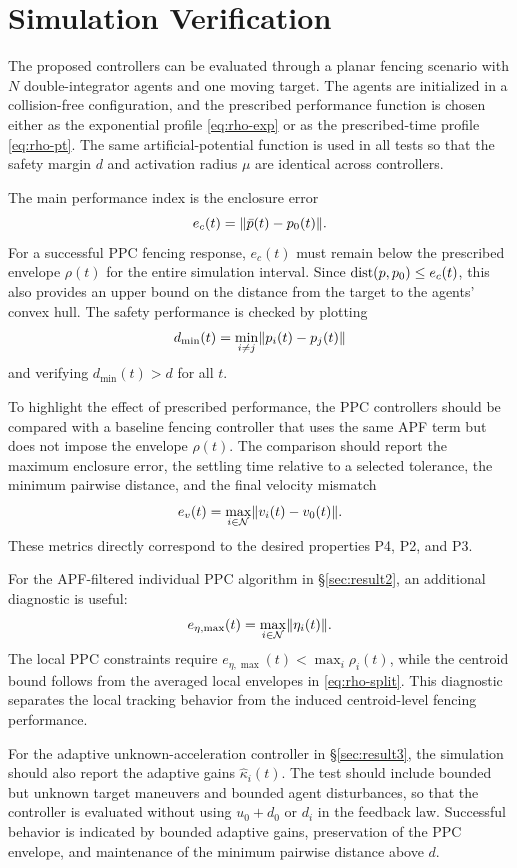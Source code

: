 \section{Simulation Verification}
\label{sec:simulation}

The proposed controllers can be evaluated through a planar fencing scenario
with $N$ double-integrator agents and one moving target.  The agents are
initialized in a collision-free configuration, and the prescribed
performance function is chosen either as the exponential profile
\eqref{eq:rho-exp} or as the prescribed-time profile \eqref{eq:rho-pt}.  The
same artificial-potential function is used in all tests so that the safety
margin $d$ and activation radius $\mu$ are identical across controllers.

The main performance index is the enclosure error
\[
e_c(t)=\lVert \bar p(t)-p_0(t) \rVert.
\]
For a successful PPC fencing response, $e_c(t)$ must remain below the
prescribed envelope $\rho(t)$ for the entire simulation interval.  Since
$\mathrm{dist}(p,p_0)\le e_c(t)$, this also provides an upper bound on the distance
from the target to the agents' convex hull.  The safety performance is
checked by plotting
\[
d_{\min}(t)=\min_{i\neq j}\lVert p_i(t)-p_j(t) \rVert
\]
and verifying $d_{\min}(t)>d$ for all $t$.

To highlight the effect of prescribed performance, the PPC controllers
should be compared with a baseline fencing controller that uses the same APF
term but does not impose the envelope $\rho(t)$.  The comparison should
report the maximum enclosure error, the settling time relative to a selected
tolerance, the minimum pairwise distance, and the final velocity mismatch
\[
e_v(t)=\max_{i\in\mathcal{N}}\lVert v_i(t)-v_0(t) \rVert.
\]
These metrics directly correspond to the desired properties P4, P2, and P3.

For the APF-filtered individual PPC algorithm in \S\ref{sec:result2}, an
additional diagnostic is useful:
\[
e_{\eta,\max}(t)=\max_{i\in\mathcal{N}}\lVert \eta_i(t) \rVert.
\]
The local PPC constraints require $e_{\eta,\max}(t)<\max_i\rho_i(t)$, while
the centroid bound follows from the averaged local envelopes in
\eqref{eq:rho-split}.  This diagnostic separates the local tracking behavior
from the induced centroid-level fencing performance.

For the adaptive unknown-acceleration controller in \S\ref{sec:result3}, the
simulation should also report the adaptive gains $\hat\kappa_i(t)$.  The
test should include bounded but unknown target maneuvers and bounded agent
disturbances, so that the controller is evaluated without using
$u_0+d_0$ or $d_i$ in the feedback law.  Successful behavior is indicated by
bounded adaptive gains, preservation of the PPC envelope, and maintenance of
the minimum pairwise distance above $d$.


